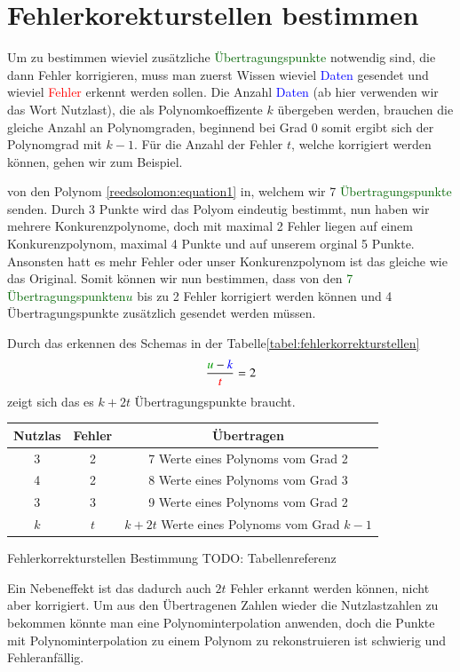 \section{Fehlerkorekturstellen bestimmen
\label{reedsolomon:section:Fehlerkorrekturstellen}}
Um zu bestimmen wieviel zusätzliche \textcolor{darkgreen}{Übertragungspunkte} notwendig sind, die dann Fehler korrigieren,
muss man zuerst Wissen wieviel \textcolor{blue}{Daten} gesendet und wieviel \textcolor{red}{Fehler} erkennt werden sollen. 
Die Anzahl \textcolor{blue}{Daten} (ab hier verwenden wir das Wort Nutzlast), die als Polynomkoeffizente $k$ übergeben werden, 
brauchen die gleiche Anzahl an Polynomgraden, beginnend bei Grad 0 somit ergibt sich der Polynomgrad mit $k-1$.
Für die Anzahl der Fehler $t$, welche korrigiert werden können, gehen wir zum Beispiel.
\begin{beispiel} von den Polynom \ref{reedsolomon:equation1} in, welchem wir 7 \textcolor{darkgreen}{Übertragungspunkte} senden.
Durch 3 Punkte wird das Polyom eindeutig bestimmt, nun haben wir mehrere Konkurenzpolynome, doch mit maximal 2 Fehler liegen auf einem Konkurenzpolynom,
maximal 4 Punkte und auf unserem orginal 5 Punkte. Ansonsten hatt es mehr Fehler oder unser Konkurenzpolynom ist das gleiche wie das Original. 
Somit können wir nun bestimmen, dass von den \textcolor{darkgreen}{7 Übertragungspunkten$u$} bis zu 2 Fehler korrigiert werden können und 4 Übertragungspunkte zusätzlich gesendet werden müssen.
\end{beispiel}
Durch das erkennen des Schemas in der Tabelle\ref{tabel:fehlerkorrekturstellen}
\begin{equation}
    \frac{\textcolor{darkgreen}{u}-\textcolor{blue}{k}}{\textcolor{red}{t}}
    =2
    \label{reedsolomon:equation2}
\end{equation}
zeigt sich das es $k+2t$ Übertragungspunkte braucht.

\begin{center}
    \begin{tabular}{ c c | c} 
        \hline
        Nutzlas & Fehler & Übertragen \\
        \hline 
        3 & 2 & 7 Werte eines Polynoms vom Grad 2 \\ 
        4 & 2 & 8 Werte eines Polynoms vom Grad 3 \\
        3 & 3 & 9 Werte eines Polynoms vom Grad 2 \\ 
        \hline
        $k$ & $t$ & $k+2t$ Werte eines Polynoms vom Grad $k-1$ \\ 
        \hline
    \end{tabular}
    Fehlerkorrekturstellen Bestimmung TODO: Tabellenreferenz
	\label{tabel:fehlerkorrekturstellen}
\end{center}

Ein Nebeneffekt ist das dadurch auch $2t$ Fehler erkannt werden können, nicht aber korrigiert.
Um aus den Übertragenen Zahlen wieder die Nutzlastzahlen zu bekommen könnte man eine Polynominterpolation anwenden,
doch die Punkte mit Polynominterpolation zu einem Polynom zu rekonstruieren ist schwierig und Fehleranfällig.

